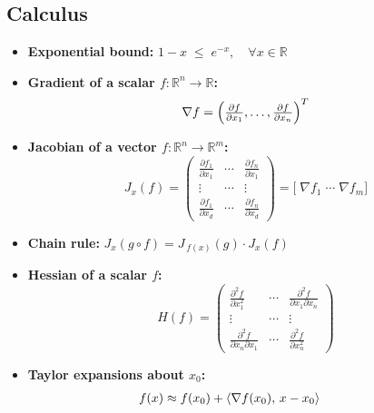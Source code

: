 \subsection{Calculus}
\begin{itemize}
      \item \textbf{Exponential bound:} $1 - x \;\le\; e^{-x},\quad \forall x\in\mathbb R$
      \item \textbf{Gradient of a scalar \(f:\mathbb{R}^n\to\mathbb{R}\):}
            \[
                  \nabla f
                  = \Bigl(\tfrac{\partial f}{\partial x_1},\dots,\tfrac{\partial f}{\partial x_n}\Bigr)^T
            \]
      \item \textbf{Jacobian of a vector \(f:\mathbb{R}^n\to\mathbb{R}^m\):}
            \[
                  J_x(f)
                  = \begin{pmatrix}
                        \frac{\partial f_1}{\partial x_1} & \cdots & \frac{\partial f_n}{\partial x_1} \\
                        \vdots                            & \cdots & \vdots                            \\
                        \frac{\partial f_1}{\partial x_d} & \cdots & \frac{\partial f_n}{\partial x_d}
                  \end{pmatrix}
                  = \bigl[\;\nabla f_1\;\cdots\;\nabla f_m\bigr]
            \]
      \item \textbf{Chain rule:} $J_x(g\circ f) = J_{\,f(x)}(g)\cdot J_x(f)$
      \item \textbf{Hessian of a scalar \(f\):}
            \[
                  H(f)
                  = \begin{pmatrix}
                        \frac{\partial^2f}{\partial x_1^2}           & \cdots & \frac{\partial^2f}{\partial x_1\partial x_n} \\
                        \vdots                                       & \cdots & \vdots                                       \\
                        \frac{\partial^2f}{\partial x_n\partial x_1} & \cdots & \frac{\partial^2f}{\partial x_n^2}
                  \end{pmatrix}
            \]
      \item \textbf{Taylor expansions about \(x_0\):}
            \begin{align}
                   & \hspace{-1.5em}f(x)\approx f(x_0)+\langle\nabla f(x_0),\,x-x_0\rangle

\end{align}
\end{itemize}
